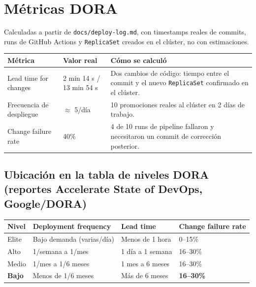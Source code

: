 \documentclass[11pt,a4paper]{article}
\begin{document}
\section{Métricas DORA}

Calculadas a partir de \texttt{docs/deploy-log.md}, con timestamps reales de commits, runs de
GitHub Actions y \texttt{ReplicaSet} creados en el clúster, no con estimaciones.

\begin{center}
\begin{tabular}{@{}p{4.3cm}p{3.2cm}p{7cm}@{}}
\toprule
\textbf{Métrica} & \textbf{Valor real} & \textbf{Cómo se calculó} \\
\midrule
Lead time for changes & 2 min 14 s / 13 min 54 s & Dos cambios de código: tiempo entre el commit y el nuevo \texttt{ReplicaSet} confirmado en el clúster. \\
Frecuencia de despliegue & $\approx$ 5/día & 10 promociones reales al clúster en 2 días de trabajo. \\
Change failure rate & 40\% & 4 de 10 runs de pipeline fallaron y necesitaron un commit de corrección posterior. \\
\bottomrule
\end{tabular}
\end{center}

\subsection*{Ubicación en la tabla de niveles DORA (reportes Accelerate State of DevOps, Google/DORA)}

\begin{center}
\begin{tabular}{@{}p{2.2cm}p{4.5cm}p{3.3cm}p{3.3cm}@{}}
\toprule
\textbf{Nivel} & \textbf{Deployment frequency} & \textbf{Lead time} & \textbf{Change failure rate} \\
\midrule
Elite & Bajo demanda (varias/día) & Menos de 1 hora & 0--15\% \\
Alto & 1/semana a 1/mes & 1 día a 1 semana & 16--30\% \\
Medio & 1/mes a 1/6 meses & 1 mes a 6 meses & 16--30\% \\
\textbf{Bajo} & Menos de 1/6 meses & Más de 6 meses & \textbf{16--30\%} \\
\bottomrule
\end{tabular}
\end{center}
\end{document}
